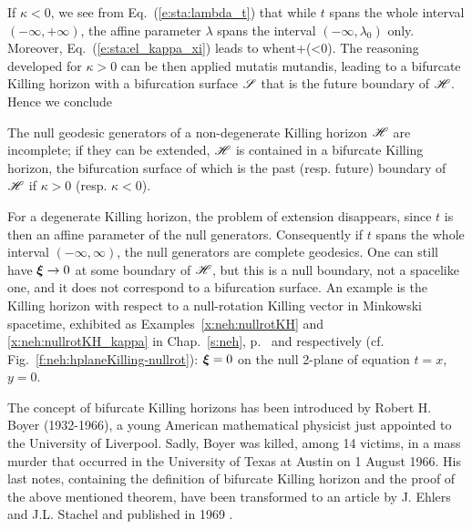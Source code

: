 If $\kappa<0$, we see from Eq.~(\ref{e:sta:lambda_t}) that while $t$ spans the
whole interval $(-\infty,+\infty)$, the affine parameter $\lambda$ spans the
interval $(-\infty,\lambda_0)$ only. Moreover, Eq.~(\ref{e:sta:el_kappa_xi})
leads to
\be
    \w{\xi}  \quad\mbox{when}\quad t\rightarrow +\infty  \qquad (\kappa<0).
\ee
The reasoning developed for $\kappa>0$ can be then applied mutatis mutandis,
leading to a bifurcate Killing horizon with a bifurcation surface $\mathscr{S}$ that
is the future boundary of $\mathscr{H}$. Hence we conclude
\begin{greybox}
The null geodesic generators of a non-degenerate Killing horizon $\mathscr{H}$ are
incomplete; if they can be extended, $\mathscr{H}$ is contained in a
bifurcate Killing horizon, the bifurcation surface of which is the past
(resp. future) boundary of $\mathscr{H}$ if $\kappa>0$ (resp. $\kappa<0$).
\end{greybox}

\begin{remark}
For a degenerate Killing horizon, the problem of extension disappears, since
$t$ is then an affine parameter of the null generators. Consequently if $t$ spans
the whole interval $(-\infty,\infty)$, the null generators are complete
geodesics. One can still have $\bm{\xi}\rightarrow 0$ at some boundary
of $\mathscr{H}$, but this is a null boundary, not a spacelike one, and it does not
correspond to a bifurcation surface. An example is the Killing horizon with
respect to a null-rotation Killing vector in Minkowski spacetime, exhibited
as Examples~\ref{x:neh:nullrotKH} and \ref{x:neh:nullrotKH_kappa}
in Chap.~\ref{s:neh}, p.~\pageref{x:neh:nullrotKH} and \pageref{x:neh:nullrotKH_kappa}
respectively (cf. Fig.~\ref{f:neh:hplaneKilling-nullrot}): $\bm{\xi}=0$
on the null 2-plane of equation $t=x$, $y=0$.
\end{remark}

\begin{hist} \label{h:sta:Boyer}
The concept of bifurcate Killing horizons has been introduced by Robert H. Boyer
(1932-1966), a young American mathematical physicist just appointed to the University
of Liverpool. Sadly, Boyer was killed, among 14 victims, in a mass murder that
occurred in the University of Texas at Austin on 1 August 1966.
His last notes, containing the definition of bifurcate Killing horizon
and the proof of the above mentioned theorem, have been transformed to an article
by J. Ehlers and J.L. Stachel and published in 1969 \cite{Boyer69}.
\end{hist}

